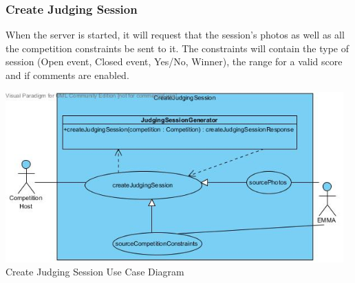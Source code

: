 \documentclass[10pt,a4paper]{article}
\begin{document}
\subsubsection{Create Judging Session}
When the server is started, it will request that the session's photos as well as all the competition constraints be sent to it. The constraints will contain the type of session (Open event, Closed event, Yes/No, Winner), the range for a valid score and if comments are enabled.

\begin{center}
\advance\leftskip-1.3cm
\includegraphics[width=130mm]{Pictures/CreateJudgingSession.jpg} 
Create Judging Session Use Case Diagram 
\end{center}
\end{document}
